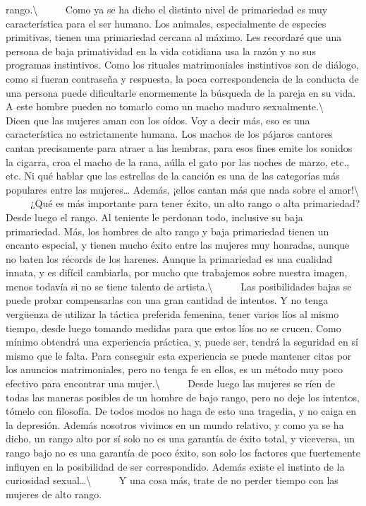 rango.\textbackslash{} ~ ~ ~ Como ya se ha dicho el distinto nivel de
primariedad es muy característica para el ser humano. Los animales,
especialmente de especies primitivas, tienen una primariedad cercana al
máximo. Les recordaré que una persona de baja primatividad en la vida
cotidiana usa la razón y no sus programas instintivos. Como los rituales
matrimoniales instintivos son de diálogo, como si fueran contraseña y
respuesta, la poca correspondencia de la conducta de una persona puede
dificultarle enormemente la búsqueda de la pareja en su vida. A este
hombre pueden no tomarlo como un macho maduro
sexualmente.\textbackslash{} ~ ~ ~ Dicen que las mujeres aman con los
oídos. Voy a decir más, eso es una característica no estrictamente
humana. Los machos de los pájaros cantores cantan precisamente para
atraer a las hembras, para esos fines emite los sonidos la cigarra, croa
el macho de la rana, aúlla el gato por las noches de marzo, etc., etc.
Ni qué hablar que las estrellas de la canción es una de las categorías
más populares entre las mujeres\ldots{} Además, ¡ellos cantan más que
nada sobre el amor!\textbackslash{} ~ ~ ~ ¿Qué es más importante para
tener éxito, un alto rango o alta primariedad? Desde luego el rango. Al
teniente le perdonan todo, inclusive su baja primariedad. Más, los
hombres de alto rango y baja primariedad tienen un encanto especial, y
tienen mucho éxito entre las mujeres muy honradas, aunque no baten los
récords de los harenes. Aunque la primariedad es una cualidad innata, y
es difícil cambiarla, por mucho que trabajemos sobre nuestra imagen,
menos todavía si no se tiene talento de artista.\textbackslash{} ~ ~ ~
Las posibilidades bajas se puede probar compensarlas con una gran
cantidad de intentos. Y no tenga vergüenza de utilizar la táctica
preferida femenina, tener varios líos al mismo tiempo, desde luego
tomando medidas para que estos líos no se crucen. Como mínimo obtendrá
una experiencia práctica, y, puede ser, tendrá la seguridad en sí mismo
que le falta. Para conseguir esta experiencia se puede mantener citas
por los anuncios matrimoniales, pero no tenga fe en ellos, es un método
muy poco efectivo para encontrar una mujer.\textbackslash{} ~ ~ ~ Desde
luego las mujeres se ríen de todas las maneras posibles de un hombre de
bajo rango, pero no deje los intentos, tómelo con filosofía. De todos
modos no haga de esto una tragedia, y no caiga en la depresión. Además
nosotros vivimos en un mundo relativo, y como ya se ha dicho, un rango
alto por sí solo no es una garantía de éxito total, y viceversa, un
rango bajo no es una garantía de poco éxito, son solo los factores que
fuertemente influyen en la posibilidad de ser correspondido. Además
existe el instinto de la curiosidad sexual\ldots{}\textbackslash{} ~ ~ ~
Y una cosa más, trate de no perder tiempo con las mujeres de alto rango.

